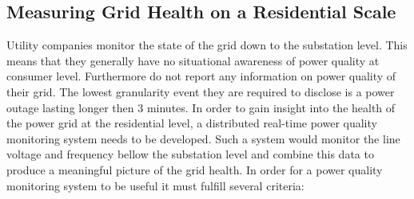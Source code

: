 \subsection{Measuring Grid Health on a Residential Scale}
Utility companies monitor the state of the grid down to the substation level. This means that they generally have no situational awareness of power quality at consumer level. Furthermore do not report any information on power quality of their grid. The lowest granularity event they are required to disclose is a power outage lasting longer then 3 minutes. In order to gain insight into the health of the power grid at the residential level, a distributed real-time power quality monitoring system needs to be developed. Such a system would monitor the line voltage and frequency bellow the substation level and combine this data to produce a meaningful picture of the grid health. In order for a power quality monitoring system to be useful it must fulfill several criteria:
